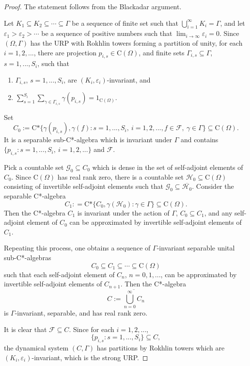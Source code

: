 \documentclass[12pt, oneside, psamsfonts]{amsart}
\theoremstyle{definition}
\theoremstyle{remark}
\numberwithin{equation}{section}
\newcommand{\eps}{\varepsilon}
\begin{document}
\begin{proof}
The statement follows from the Blackadar argument.

Let $K_1 \subseteq K_2 \subseteq \cdots \subseteq \Gamma$ be a sequence of finite set such that $\bigcup_{i=1}^\infty K_i = \Gamma$, and let $\eps_1 > \eps_2 > \cdots $ be a sequence of positive numbers such that $\lim_{i\to\infty} \eps_i = 0$. Since $(\Omega, \Gamma)$ has the URP with Rokhlin towers forming a partition of unity, for each $i=1, 2, ...$, there are projection $p_{i, s} \in \mathrm{C}(\Omega)$, and finite sets $\Gamma_{i, s} \subseteq \Gamma$, $s = 1, ..., S_i$, such that
\begin{enumerate}
\item $\Gamma_{i, s}$, $s=1, ..., S_i$, are $(K_i, \eps_i)$-invariant, and
\item $\sum_{s=1}^{S_i} \sum_{\gamma \in \Gamma_{i, s}} \gamma(p_{i, s}) = 1_{\mathrm{C}(\Omega)}$. 
\end{enumerate}

Set $$C_0:=\textrm{C*}\{\gamma(p_{i, s}), \gamma(f): s=1, ..., S_i,\ i=1, 2, ..., f \in \mathcal F,\ \gamma \in \Gamma\} \subseteq \mathrm{C}(\Omega).$$ It is a separable sub-C*-algebra which is invariant under $\Gamma$ and contains $\{p_{i, s}: s=1, ..., S_i,\ i=1, 2, ...\}$ and $\mathcal F$.

Pick a countable set $\mathcal G_0 \subseteq C_0$ which is dense in the set of  self-adjoint elements of $C_0$. Since $\mathrm{C}(\Omega)$ has real rank zero, there is a countable set $\mathcal H_0 \subseteq \mathrm{C}(\Omega)$ consisting of invertible self-adjoint elements such that $\mathcal G_0 \subseteq \overline{\mathcal H_0}$. Consider the separable C*-algebra
$$C_1: = \textrm{C*}\{C_0, \gamma(\mathcal H_0): \gamma \in \Gamma\} \subseteq \mathrm{C}(\Omega).$$
Then the C*-algebra $C_1$ is invariant under the action of $\Gamma$, $C_0 \subseteq C_1$, and any self-adjoint element of $C_0$ can be approximated by invertible self-adjoint elements of $C_1$.

Repeating this process, one obtains a sequence of $\Gamma$-invariant separable unital sub-C*-algebras $$C_0 \subseteq C_1 \subseteq \cdots \subseteq \mathrm{C}(\Omega)$$
such that each self-adjoint element of $C_n$, $n=0, 1, ...$, can be approximated by invertible self-adjoint elements of $C_{n+1}$. Then the C*-algebra $$C:=\overline{\bigcup_{n=0}^\infty C_n}$$ is $\Gamma$-invariant, separable, and has real rank zero. 

It is clear that $\mathcal F \subseteq C$. Since for each $i=1, 2, ...$, $$\{p_{i, s}: s=1, ..., S_i\} \subseteq C,$$ the dynamical system $(C, \Gamma)$ has partitions by Rokhlin towers which are $(K_i, \eps_i)$-invariant, which is the strong URP.
\end{proof}
\end{document}
